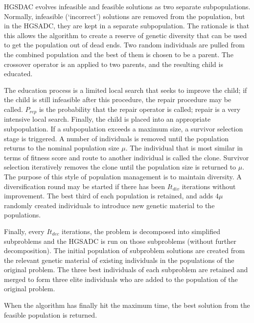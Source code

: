 \documentclass{sig-alternate}
\begin{document}
HGSDAC evolves infeasible and feasible solutions as two separate subpopulations. Normally, infeasible (`incorrect') solutions are removed from the population, but in the HGSADC, they are kept in a separate subpopulation. The rationale is that this allows the algorithm to create a reserve of genetic diversity that can be used to get the population out of dead ends. Two random individuals are pulled from the combined population and the best of them is chosen to be a parent. The crossover operator is an applied to two parents, and the resulting child is educated.

The education process is a limited local search that seeks to improve the child; if the child is still infeasible after this procedure, the repair procedure may be called. $P_{rep}$ is the probability that the repair operator is called; repair is a very intensive local search. Finally, the child is placed into an appropriate subpopulation. If a subpopulation exceeds a maximum size, a survivor selection stage is triggered. A number of individuals is removed until the population returns to the nominal population size $\mu$. The individual that is most similar in terms of fitness score and route to another individual is called the clone. Survivor selection iteratively removes the clone until the population size is returned to $\mu$. The purpose of this style of population management is to maintain diversity. A diversification round may be started if there has been $It_{div}$ iterations without improvement. The best third of each population is retained, and adds $4\mu$ randomly created individuals to introduce new genetic material to the populations. 

Finally, every $It_{dec}$ iterations, the problem is decomposed into simplified subproblems and the HGSADC is run on those subproblems (without further decomposition). The initial population of subproblem solutions are created from the relevant genetic material of existing individuals in the populations of the original problem. The three best individuals of each subproblem are retained and merged to form three elite individuals who are added to the population of the original problem.

When the algorithm has finally hit the maximum time, the best solution from the feasible population is returned.
\end{document}
